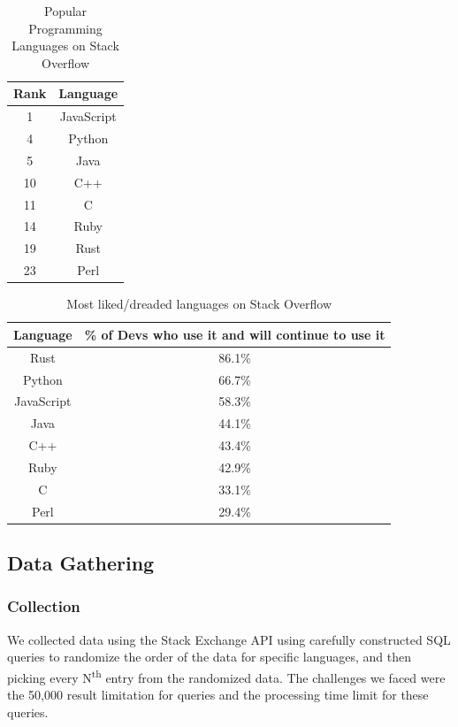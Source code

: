\documentclass[conference]{IEEEtran}
\begin{document}
\begin{table}[htbp]
\caption{Popular Programming Languages on Stack Overflow}
\begin{center}
\begin{tabular}{|c|c|}
\hline
\textbf{Rank}&\textbf{Language}\\
\hline
1&JavaScript\\
\hline
4&Python\\
\hline
5&Java\\
\hline
10&C++\\
\hline
11&C\\
\hline
14&Ruby\\
\hline
19&Rust\\
\hline
23&Perl\\
\hline
\end{tabular}
\label{tab1}
\end{center}
\end{table}

\begin{table}[htbp]
\caption{Most liked/dreaded languages on Stack Overflow}
\begin{center}
\begin{tabular}{|c|c|}
\hline
\textbf{Language}&\textbf{\% of Devs who use it and will continue to use it}\\
\hline
Rust&86.1\%\\
\hline
Python&66.7\%\\
\hline
JavaScript&58.3\%\\
\hline
Java&44.1\%\\
\hline
C++&43.4\%\\
\hline
Ruby&42.9\%\\
\hline
C&33.1\%\\
\hline
Perl&29.4\%\\
\hline
\end{tabular}
\label{tab1}
\end{center}
\end{table}

\subsection{Data Gathering}
\subsubsection{Collection}
We collected data using the Stack Exchange API \cite{b28} using carefully constructed SQL queries to randomize the order of the data for specific languages, and then picking every N\textsuperscript{th} entry from the randomized data. The challenges we faced were the 50,000 result limitation for queries and the processing time limit for these queries.\\
\end{document}

